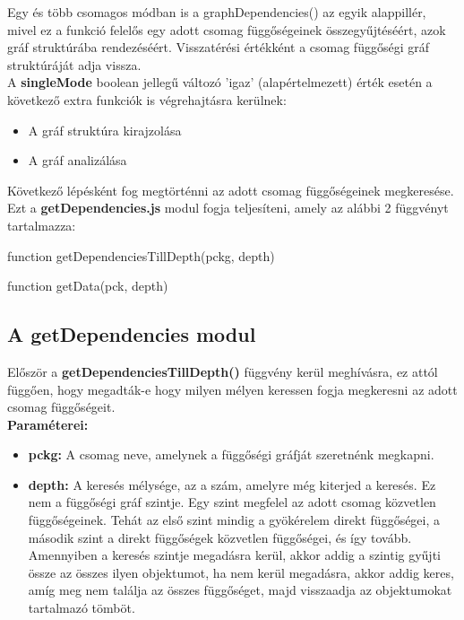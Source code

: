 Egy és több csomagos módban is a graphDependencies() az egyik alappillér, mivel ez a funkció felelős egy adott csomag függőségeinek összegyűjtéséért, azok gráf struktúrába rendezéséért.
Visszatérési értékként a csomag függőségi gráf struktúráját adja vissza.\\

A \textbf{singleMode} boolean jellegű változó 'igaz' (alapértelmezett) érték esetén a következő extra funkciók is végrehajtásra kerülnek:
	\begin{itemize}
		\item A gráf struktúra kirajzolása
		\item A gráf analizálása
	\end{itemize}

Következő lépésként fog megtörténni az adott csomag függőségeinek megkeresése. Ezt a \textbf{getDependencies.js} modul fogja teljesíteni, amely az alábbi 2 függvényt tartalmazza:

\begin{js}
function getDependenciesTillDepth(pckg, depth)

function getData(pck, depth)
\end{js}

\subsection{A getDependencies modul}

Először a \textbf{getDependenciesTillDepth()} függvény kerül meghívásra, ez attól függően, hogy megadták-e hogy milyen mélyen keressen fogja megkeresni az adott csomag függőségeit.\\

\noindent \textbf{Paraméterei:}

\begin{itemize}
	\item \textbf{pckg: }A csomag neve, amelynek a függőségi gráfját szeretnénk megkapni.
	\item \textbf{depth: }A keresés mélysége, az a szám, amelyre még kiterjed a keresés. Ez nem a függőségi gráf szintje. Egy szint megfelel az adott csomag közvetlen függőségeinek. Tehát az első szint mindig a gyökérelem direkt függőségei, a második szint a direkt függőségek közvetlen függőségei, és így tovább.	Amennyiben a keresés szintje megadásra kerül, akkor addig a szintig gyűjti össze az összes ilyen objektumot, ha nem kerül megadásra, akkor addig keres, amíg meg nem találja az összes függőséget, majd visszaadja az objektumokat tartalmazó tömböt.
\end{itemize}

